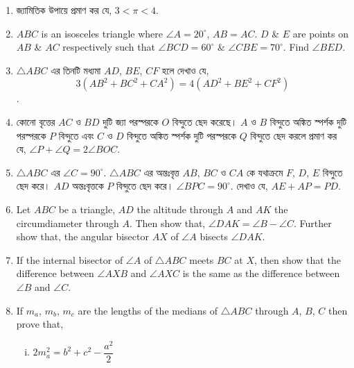 \documentclass[11pt, a4paper]{article}
\begin{document}
\begin{enumerate}
	\item \textbengali{জ্যামিতিক উপায়ে প্রমাণ কর যে,} $3 < \pi < 4$.
	
	\item $ABC$ is an isosceles triangle where $\angle A = 20^{\circ}$, $AB = AC$. $D$ \& $E$ are points on $AB$ \& $AC$ respectively such that $\angle BCD = 60^{\circ}$ \& $\angle CBE = 70^{\circ}$. Find $\angle BED$.
	
	
	\item $\bigtriangleup ABC$ \textbengali{এর তিনটি মধ্যমা} $AD$, $BE$, $CF$ \textbengali{হলে দেখাও যে,} $$3(AB^2 + BC^2 + CA^2) = 4(AD^2 + BE^2 + CF^2)$$.
	
	\item \textbengali{কোনো বৃত্তের} $AC$ \textbengali{ও} $BD$ \textbengali{দুটি জ্যা পরস্পরকে} $O$ \textbengali{বিন্দুতে ছেদ করেছে।} $A$ \textbengali{ও} $B$ \textbengali{বিন্দুতে অঙ্কিত স্পর্শক দুটি পরস্পরকে} $P$ \textbengali{বিন্দুতে এবং} $C$ \textbengali{ও} $D$ \textbengali{বিন্দুতে অঙ্কিত স্পর্শক দুটি পরস্পরকে} $Q$ \textbengali{বিন্দুতে ছেদ করলে প্রমাণ কর যে,} $\angle P + \angle Q = 2 \angle BOC$.
	

	\item $\bigtriangleup ABC$ \textbengali{এর} $\angle C = 90^{\circ}$. $\bigtriangleup ABC$ \textbengali{এর অন্তঃবৃত্ত} $AB$, $BC$ \textbengali{ও} $CA$ \textbengali{কে যথাক্রমে} $F$, $D$, $E$ \textbengali{বিন্দুতে ছেদ করে।} $AD$ \textbengali{অন্তঃবৃত্তকে} $P$ \textbengali{বিন্দুতে ছেদ করে।} $\angle BPC = 90^{\circ}.$ \textbengali{দেখাও যে,} $AE + AP = PD$.
	
	\item Let $ABC$ be a triangle, $AD$ the altitude through $A$ and $AK$ the circumdiameter through $A$. Then show that, $\angle DAK = \angle B - \angle C$. Further show that, the angular bisector $AX$ of $\angle A$ bisects $\angle DAK$.
	
	\item If the internal bisector of $\angle A$ of $\bigtriangleup ABC$ meets $BC$ at $X$, then show that the difference between $\angle AXB$ and $\angle AXC$ is the same as the difference between $\angle B$ and $\angle C$.
	
	\item If $m_a$, $m_b$, $m_c$ are the lengths of the medians of $\bigtriangleup ABC$ through $A$, $B$, $C$ then prove that,
		\begin{enumerate}[(i)]
			\item $2m_a^2 = b^2 + c^2 - \dfrac{a^2}{2}$
			

\end{enumerate}
\end{enumerate}
\end{document}
